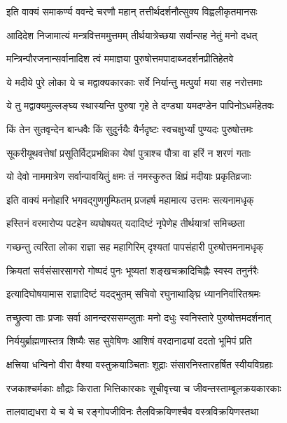 
\twolineshloka
{इति वाक्यं समाकर्ण्य ववन्दे चरणौ महान्}
{तत्तीर्थदर्शनौत्सुक्य विह्वलीकृतमानसः}%

\twolineshloka
{आदिदेश निजामात्यं मन्त्रवित्तममुत्तमम्}
{तीर्थयात्रेच्छया सर्वान्सह नेतुं मनो दधत्}%

\twolineshloka
{मन्त्रिन्पौरजनान्सर्वानादिश त्वं ममाज्ञया}
{पुरुषोत्तमपादाब्जदर्शनप्रीतिहेतवे}%

\twolineshloka
{ये मदीये पुरे लोका ये च मद्वाक्यकारकाः}
{सर्वे निर्यान्तु मत्पुर्या मया सह नरोत्तमाः}%

\twolineshloka
{ये तु मद्वाक्यमुल्लङ्घ्य स्थास्यन्ति पुरुषा गृहे}
{ते दण्ड्या यमदण्डेन पापिनोऽधर्महेतवः}%

\twolineshloka
{किं तेन सुतवृन्देन बान्धवैः किं सुदुर्नयैः}
{यैर्नदृष्टः स्वचक्षुर्भ्यां पुण्यदः पुरुषोत्तमः}%

\twolineshloka
{सूकरीयूथवत्तेषां प्रसूतिर्विट्प्रभक्षिका}
{येषां पुत्राश्च पौत्रा वा हरिं न शरणं गताः}%

\twolineshloka
{यो देवो नाममात्रेण सर्वान्पावयितुं क्षमः}
{तं नमस्कुरुत क्षिप्रं मदीयाः प्रकृतिव्रजाः}%

\twolineshloka
{इति वाक्यं मनोहारि भगवद्गुणगुम्फितम्}
{प्रजहर्ष महामात्य उत्तमः सत्यनामधृक्}%

\twolineshloka
{हस्तिनं वरमारोप्य पटहेन व्यघोषयत्}
{यदादिष्टं नृपेणेह तीर्थयात्रां समिच्छता}%

\twolineshloka
{गच्छन्तु त्वरिता लोका राज्ञा सह महागिरिम्}
{दृश्यतां पापसंहारी पुरुषोत्तमनामधृक्}%

\twolineshloka
{क्रियतां सर्वसंसारसागरो गोष्पदं पुनः}
{भूष्यतां शङ्खचक्रादिचिह्नैः स्वस्व तनुर्नरैः}%

\twolineshloka
{इत्यादिघोषयामास राज्ञादिष्टं यदद्भुतम्}
{सचिवो रघुनाथाङ्घ्रि ध्याननिर्वारितश्रमः}%

\twolineshloka
{तच्छ्रुत्वा ताः प्रजाः सर्वा आनन्दरससम्प्लुताः}
{मनो दधुः स्वनिस्तारे पुरुषोत्तमदर्शनात्}%

\twolineshloka
{निर्ययुर्ब्राह्मणास्तत्र शिष्यैः सह सुवेषिणः}
{आशिषं वरदानाढ्यां ददतो भूमिपं प्रति}%

\twolineshloka
{क्षत्त्रिया धन्विनो वीरा वैश्या वस्तुक्रयाञ्चिताः}
{शूद्राः संसारनिस्तारहर्षित स्वीयविग्रहाः}%

\twolineshloka
{रजकाश्चर्मकाः क्षौद्राः किराता भित्तिकारकाः}
{सूचीवृत्त्या च जीवन्तस्ताम्बूलक्रयकारकाः}%

\twolineshloka
{तालवाद्यधरा ये च ये च रङ्गोपजीविनः}
{तैलविक्रयिणश्चैव वस्त्रविक्रयिणस्तथा}%

